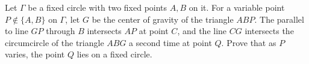 Let $\Gamma$ be a fixed circle with two fixed points $A, B$ on it.
For a variable point $P\not\in\{A, B\}$ on $\Gamma$, let $G$ be the center of gravity of the triangle $ABP$.
The parallel to line $GP$ through $B$ intersects $AP$ at point $C$,
and the line $CG$ intersects the circumcircle of the triangle $ABG$ a second time at point $Q$.
Prove that as $P$ varies, the point $Q$ lies on a fixed circle.
